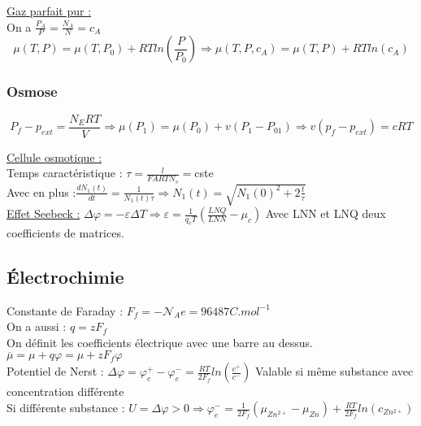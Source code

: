 \documentclass[../main.tex]{subfiles}
\begin{document}
\quad \underline{Gaz parfait pur :}\\
On a $\frac{P_A}{P} = \frac{N_A}{N} = c_A$\\
\begin{equation}
    \mu(T,P) = \mu(T,P_0) + RT ln(\frac{P}{P_0}) \Rightarrow \mu(T,P,c_A) = \mu(T,P) + RT ln(c_A)
\end{equation}

\subsubsection{Osmose}
\begin{equation}
    P_f - p_{ext} = \frac{N_E RT}{V} \Rightarrow \mu(P_1) = \mu(P_0) + v(P_1-P_01) \Rightarrow v(p_f-p_{ext}) = cRT
\end{equation}

\quad \underline{Cellule osmotique :}\\
Temps caractéristique : $\tau = \frac{l}{FARTN_s} = $cste\\
Avec en plus :$\frac{dN_1(t)}{dt} = \frac{1}{N_1(t) \tau} \Rightarrow N_1(t) = \sqrt{N_1(0)^2 + 2\frac{t}{\tau}}$\\

\quad \underline{Effet Seebeck :} $\Delta \varphi = -\varepsilon \Delta T \Rightarrow \varepsilon = \frac{1}{q_e T}(\frac{LNQ}{LNN}-\mu_c)$ Avec LNN et LNQ deux coefficients de matrices.\\

\subsection{Électrochimie}
Constante de Faraday : $F_f = -\mathcal{N}_A e = 96487C.mol^{-1}$\\
On a aussi : $q=zF_f$\\
On définit les coefficients électrique avec une barre au dessus.\\
$\overline{\mu} = \mu + q \varphi = \mu + z F_f \varphi$\\
Potentiel de Nerst : $\Delta \varphi = \varphi_e^+ - \varphi_e^- = \frac{RT}{2F_f} ln(\frac{c^+}{c^-})$ Valable si même substance avec concentration différente\\
Si différente substance : $U = \Delta \varphi > 0 \Rightarrow \varphi_e^- = \frac{1}{2F_f} (\mu_{Zn^{2+}} - \mu_{Zn}) + \frac{RT}{2F_f} ln(c_{Zn^{2+}})$\\
\end{document}
